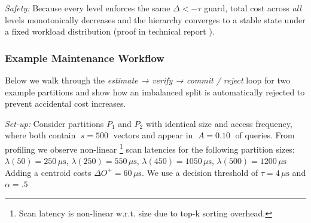 \smallskip
\noindent\textit{Safety:}  
Because every level enforces the same
\mbox{$\Delta<-\tau$} guard, total cost across \emph{all} levels
monotonically decreases and the hierarchy converges to a stable state
under a fixed workload distribution (proof in technical report \cite{mohoney2025quakeadaptiveindexingvector}).


\subsubsection{Example Maintenance Workflow}
Below we walk through the \emph{estimate → verify → commit /
reject} loop for two example partitions and show how an
imbalanced split is automatically rejected to prevent accidental cost increases.

\noindent\textit{Set-up:}\;
Consider partitions $P_1$ and $P_2$ with identical size and access frequency, where both contain
$\;s\!=\!500\;$ vectors and appear in
$\;A\!=\!0.10\;$ of queries. From profiling we observe non-linear \footnote{Scan latency is non-linear w.r.t. size due to top-k sorting overhead.} scan latencies for the following partition sizes: $\lambda(50)=250\,\mu\text{s}$, $\lambda(250)=550\,\mu\text{s}$, $\lambda(450)=1050\,\mu\text{s}$, $\lambda(500)=1200\,\mu\text{s}$ Adding a centroid costs $\Delta O^{+}=60\,\mu\text{s}$.
We use a decision threshold of $\tau=4\,\mu\text{s}$ and $\alpha=.5$

